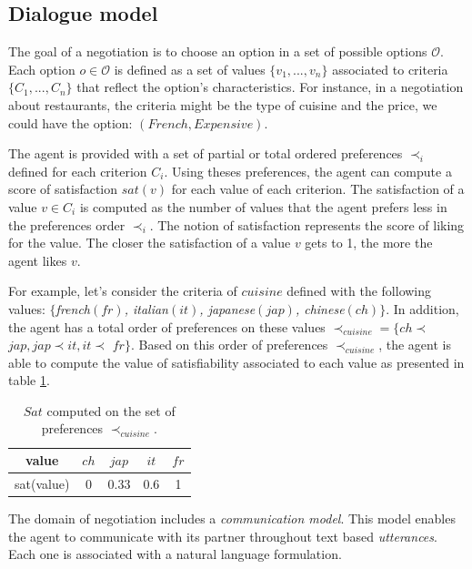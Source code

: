 \documentclass[conference, letterpaper]{IEEEtran}
\begin{document}
	
	\subsection{Dialogue model}
	
	\label{sec:dialogue-model}
	
	The goal of a negotiation is to choose an option in a set of possible options $\mathcal{O}$. Each option $o\in\mathcal{O}$ is defined as a set of values $\{v_1, ..., v_n\}$ associated to criteria $\{C_1, ..., C_n\}$ that reflect the option's characteristics.  
	For instance, in a negotiation about restaurants, the criteria might be the type of cuisine and the price, we could have the option: $(French,Expensive)$.
	
	The agent is provided with a set of partial or total ordered preferences $\prec_i$ defined for each criterion $C_i$. Using theses preferences, the agent can compute a score of satisfaction $sat(v)$ for each value of each criterion. The satisfaction of a value $v \in C_i$ is computed as the number of values that the agent prefers less in the preferences order $\prec_i$. The notion of satisfaction represents the score of liking for the value. The closer the satisfaction of a value $v$ gets to 1, the more the agent likes $v$.
	 
	 
	For example, let's consider the criteria of $cuisine$ defined with the following values: $\{$\emph{french$(fr)$, italian$(it)$, japanese$(jap)$, chinese$(ch)$}$\}$. In addition, the agent has a total order of preferences on these values $\prec_{cuisine}$$=\{ch$$\prec$$jap, jap$$\prec$$it, it$$\prec$ $fr\}$. Based on this order of preferences $\prec_{cuisine}$, the agent is able to compute the value of satisfiability associated to each value as presented in table \ref{tab:sat}.
	
	\begin{table} [h]
		\centering
				\large
		\begin{tabular}{ |c|c|c|c|c| }
		\hline
		value & $ch$ & $jap$ & $it$ & $fr$ \\	
		\hline
		sat(value) & 0 & 0.33 & 0.6 & 1 \\
		\hline
	\end{tabular}
		\caption{$Sat$ computed on the set of preferences $\prec_{cuisine}$.}
		\label{tab:sat}

	\end{table}


	
	The domain of negotiation includes a \emph{communication model}. This model enables the agent to communicate with its partner throughout text based \textit{utterances}. 
	Each one is associated with a natural language formulation.%
	
\end{document}
